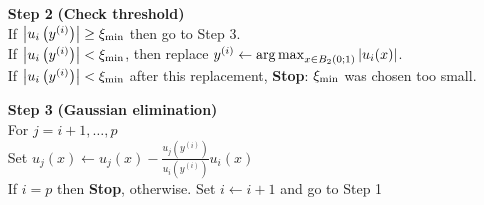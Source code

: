 {\begin{fullwidth}[leftmargin=0in, rightmargin=0in, width=\linewidth-0.35in]
\begin{flushleft}
\begin{algorithm}[H]
\begin{itemize}
        \item[\textbf{Step 2}] \textbf{(Check threshold)} \\
                If $\left|u_i\left(y^{(i)}\right)\right| \ge \xi_{\text{min}}$ then go to Step 3. \\
                If $\left|u_i\left(y^{(i)}\right)\right| < \xi_{\text{min}}$, then replace $y^{(i)} \gets \operatorname*{arg\,max}_{x \in B_2\left(0; 1 \right)}\left|u_i(x)\right|$. \\
				If $\left|u_i\left(y^{(i)}\right)\right| < \xi_{\text{min}}$ after this replacement,  \textbf{Stop}: $\xi_{\text{min}}$ was chosen too small.
        \item[\textbf{Step 3}] \textbf{(Gaussian elimination)} \\
        	For $j = i+1, \ldots, p$ \\
        	\hspace{2em} Set $u_j(x) \gets u_j(x) - \frac{u_j\left(y^{(i)}\right)}{u_i\left(y^{(i)}\right)} u_i(x)$ \\
            If $i = p$ then \textbf{Stop}, otherwise.  Set $i \gets i+1$ and go to Step 1
    \end{itemize}
\end{algorithm}

\end{flushleft}
\end{fullwidth}
}


%
%
%
%

